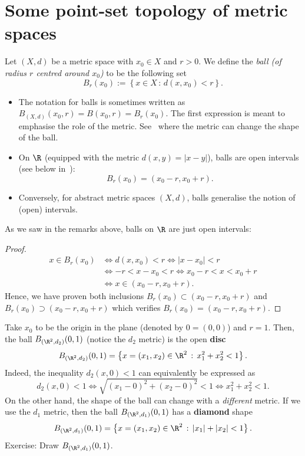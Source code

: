 \section{Some point-set topology of metric spaces}
\label{sec:point-set}
\begin{defn}[Balls]
\label{defn:ball}
Let $(X,d)$ be a metric space with $x_0\in X$ and $r>0$. We define the \textit{ball (of radius $r$ centred around $x_0$)} to be the following set
\[
B_r(x_0):= \left\{
x\in X \, : \, d(x,x_0)<r
\right\}.
\]
\end{defn}
\begin{rem}
	\begin{itemize}
		\item The notation for balls is sometimes written as $B_{(X,d)}(x_0,r) =B(x_0,r) = B_r(x_0)$. The first expression is meant to emphasise the role of the metric. See~ where the metric can change the shape of the ball.
		\item On $\R$ (equipped with the metric $d(x,y) = |x-y|$), balls are open intervals (see below in~):
		\[
		B_r(x_0) = (x_0-r,x_0+r).
		\]
		\item Conversely, for abstract metric spaces $(X,d)$, balls generalise the notion of (open) intervals.
	\end{itemize}
\end{rem}
\begin{eg}[Balls on $\R$]
	\label{eg:ball_R}
	As we saw in the remarks above, balls on $\R$ are just open intervals:
	\begin{proof}
	\begin{align*}
		x \in B_r(x_0) 	&\iff d(x,x_0)< r \iff |x-x_0| < r 	\\
		&\iff -r < x-x_0 < r \iff x_0-r<x<x_0+r 	\\
		&\iff x\in (x_0-r,x_0+r).
	\end{align*}
	Hence, we have proven both inclusions $B_r(x_0) \subset (x_0-r,x_0+r)$ and $B_r(x_0) \supset (x_0-r,x_0+r)$ which verifies $B_r(x_0) = (x_0-r,x_0+r)$.
	\end{proof}
\end{eg}
\begin{eg}[Balls on $\R^2$]
	\label{eg:ball_metric}
	Take $x_0$ to be the origin in the plane (denoted by $0 = (0,0)$) and $r=1$. Then, the ball $B_{(\R^2,d_2)}(0,1)$ (notice the $d_2$ metric) is the open \textbf{disc}
	\[
	B_{(\R^2,d_2)}(0,1) = \left\{
	x = (x_1,x_2) \in \R^2 \, : \, x_1^2 + x_2^2 < 1 
	\right\}.
	\]
	Indeed, the inequality $d_2(x,0) < 1$ can equivalently be expressed as
	\[
	d_2(x,0) < 1 \iff \sqrt{(x_1-0)^2 + (x_2-0)^2}< 1 \iff x_1^2 + x_2^2 < 1.
	\]
	On the other hand, the shape of the ball can change with a \textit{different} metric. If we use the $d_1$ metric, then the ball $B_{(\R^2,d_1)}(0,1)$ has a \textbf{diamond} shape
	\[
	B_{(\R^2,d_1)}(0,1) = \left\{
	x = (x_1,x_2)\in \R^2 \, : \, |x_1| + |x_2| < 1
	\right\}.
	\]
	Exercise: Draw $B_{(\R^2,d_1)}(0,1)$.
\end{eg}
